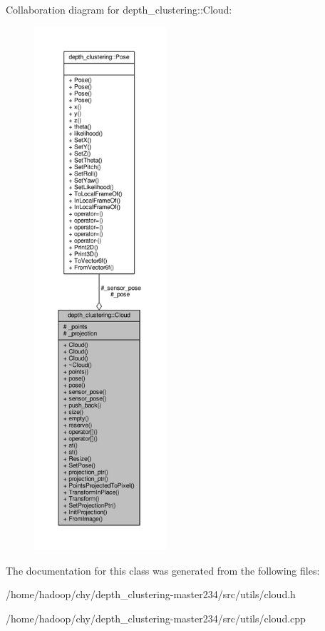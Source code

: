 Collaboration diagram for depth\-\_\-clustering\-:\-:Cloud\-:
\nopagebreak
\begin{figure}[H]
\begin{center}
\leavevmode
\includegraphics[height=550pt]{classdepth__clustering_1_1Cloud__coll__graph}
\end{center}
\end{figure}


The documentation for this class was generated from the following files\-:\begin{DoxyCompactItemize}
\item 
/home/hadoop/chy/depth\-\_\-clustering-\/master234/src/utils/cloud.\-h\item 
/home/hadoop/chy/depth\-\_\-clustering-\/master234/src/utils/cloud.\-cpp\end{DoxyCompactItemize}
